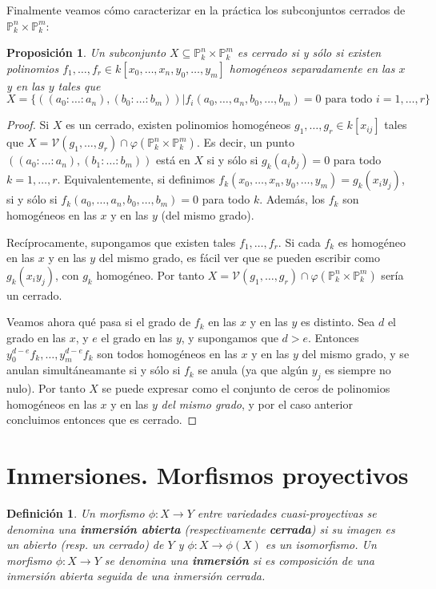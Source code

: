 \documentclass[a4paper,10pt]{book}
\newtheorem{prop}[thm]{Proposición}
\newtheorem{defn}[thm]{Definición}
\newcommand{\PP}{\mathbb P}
\newcommand{\Pnk}{\PP^n_k}
\newcommand{\Pmk}{\PP^m_k}
\newcommand{\VV}{{\mathcal V}}
\begin{document}
Finalmente veamos cómo caracterizar en la práctica los subconjuntos cerrados de $\Pnk\times\Pmk$:

\begin{prop}
 Un subconjunto $X\subseteq\Pnk\times\Pmk$ es cerrado si y sólo si existen polinomios $f_1,\ldots,f_r\in k[x_0,\ldots,x_n,y_0,\ldots,y_m]$ homogéneos separadamente en las $x$ y en las $y$ tales que 
$$
X=\{((a_0:\ldots:a_n),(b_0:\ldots:b_m))|f_i(a_0,\ldots,a_n,b_0,\ldots,b_m)=0\mbox{ para todo }i=1,\ldots,r\}
$$
\end{prop}

\begin{proof}
Si $X$ es un cerrado, existen polinomios homogéneos $g_1,\ldots,g_r\in k[x_{ij}]$ tales que $X=\VV(g_1,\ldots,g_r)\cap \varphi(\Pnk\times\Pmk)$. Es decir, un punto $((a_0:\ldots:a_n),(b_1:\ldots:b_m))$ está en $X$ si y sólo si $g_k(a_ib_j)=0$ para todo $k=1,\ldots,r$. Equivalentemente, si definimos $f_k(x_0,\ldots,x_n,y_0,\ldots,y_m)=g_k(x_iy_j)$, si y sólo si $f_k(a_0,\ldots,a_n,b_0,\ldots,b_m)=0$ para todo $k$. Además, los $f_k$ son homogéneos en las $x$ y en las $y$ (del mismo grado).

Recíprocamente, supongamos que existen tales $f_1,\ldots,f_r$. Si cada $f_k$ es homogéneo en las $x$ y en las $y$ del mismo grado, es fácil ver que se pueden escribir como $g_k(x_iy_j)$, con $g_k$ homogéneo. Por tanto $X=\VV(g_1,\ldots,g_r)\cap \varphi(\Pnk\times\Pmk)$ sería un cerrado.

Veamos ahora qué pasa si el grado de $f_k$ en las $x$ y en las $y$ es distinto. Sea $d$ el grado en las $x$, y $e$ el grado en las $y$, y supongamos que $d>e$. Entonces $y_0^{d-e}f_k,\ldots,y_m^{d-e}f_k$ son todos homogéneos en las $x$ y en las $y$ del mismo grado, y se anulan simultáneamante si y sólo si $f_k$ se anula (ya que algún $y_j$ es siempre no nulo). Por tanto $X$ se puede expresar como el conjunto de ceros de polinomios homogéneos en las $x$ y en las $y$ \emph{del mismo grado}, y por el caso anterior concluimos entonces que es cerrado. 
\end{proof}

\section{Inmersiones. Morfismos proyectivos}

\begin{defn}
 Un morfismo $\phi:X\to Y$ entre variedades cuasi-proyectivas se denomina una {\bf inmersión abierta} (respectivamente {\bf cerrada}) si su imagen es un abierto (resp. un cerrado) de $Y$ y $\phi:X\to\phi(X)$ es un isomorfismo. Un morfismo $\phi:X\to Y$ se denomina una {\bf inmersión} si es composición de una inmersión abierta seguida de una inmersión cerrada.
\end{defn}
\end{document}
